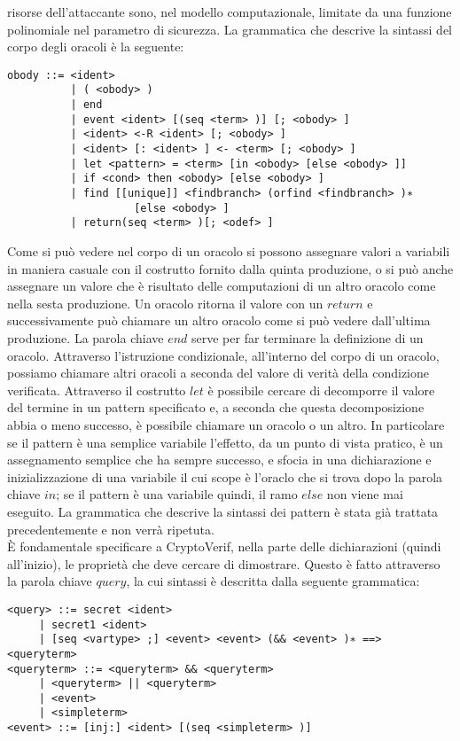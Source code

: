 \documentclass[a4paper,openright,twoside,12pt]{report}
\begin{document}
risorse dell'attaccante sono, nel modello computazionale, limitate da una funzione polinomiale nel parametro di sicurezza.
La grammatica che descrive la sintassi del corpo degli oracoli \`e la seguente:
\begin{verbatim}
obody ::= <ident>
          | ( <obody> )
          | end
          | event <ident> [(seq <term> )] [; <obody> ]
          | <ident> <-R <ident> [; <obody> ]
          | <ident> [: <ident> ] <- <term> [; <obody> ]
          | let <pattern> = <term> [in <obody> [else <obody> ]]
          | if <cond> then <obody> [else <obody> ]
          | find [[unique]] <findbranch> (orfind <findbranch> )∗ 
                    [else <obody> ]
          | return(seq <term> )[; <odef> ]

\end{verbatim}
Come si pu\`o vedere nel corpo di un oracolo si possono assegnare valori a variabili in maniera casuale con il costrutto fornito dalla quinta produzione, o si pu\`o anche
assegnare un valore che \`e risultato delle computazioni di un altro oracolo come nella sesta produzione. Un oracolo ritorna il valore con un $return$ e successivamente 
pu\`o chiamare un altro oracolo come si pu\`o vedere dall'ultima produzione. La parola chiave $end$ serve per far terminare la definizione di un oracolo.
Attraverso l'istruzione condizionale, all'interno del corpo di un oracolo, possiamo chiamare altri oracoli a seconda del valore di verit\`a della condizione verificata.
Attraverso il costrutto $let$ \`e possibile cercare di decomporre il valore del termine in un pattern specificato e, a seconda che questa decomposizione abbia o meno successo,
\`e possibile chiamare un oracolo o un altro. In particolare se il pattern \`e una semplice variabile l'effetto, da un punto di vista pratico, \`e un assegnamento semplice 
che ha sempre successo, e sfocia in una dichiarazione e inizializzazione di una variabile il cui scope \`e l'oraclo che si trova dopo la parola chiave $in$; 
se il pattern \`e una variabile quindi, il ramo $else$ non viene mai eseguito. 
La grammatica che descrive la sintassi dei pattern \`e stata gi\`a trattata precedentemente e non verr\`a ripetuta.\\
\`E fondamentale specificare a CryptoVerif, nella parte delle dichiarazioni (quindi all'inizio), 
le propriet\`a che deve cercare di dimostrare. Questo \`e fatto attraverso la parola chiave $query$, la cui sintassi \`e
descritta dalla seguente grammatica:
\begin{verbatim}
<query> ::= secret <ident>
     | secret1 <ident>
     | [seq <vartype> ;] <event> <event> (&& <event> )∗ ==> <queryterm>
<queryterm> ::= <queryterm> && <queryterm>
     | <queryterm> || <queryterm>
     | <event>
     | <simpleterm>
<event> ::= [inj:] <ident> [(seq <simpleterm> )]
\end{verbatim}
\end{document}
